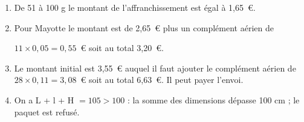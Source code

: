 \begin{enumerate}
\item %
De 51 à 100 g le montant de l'affranchissement est égal à 1,65~\euro. 
\item %
Pour Mayotte le montant est de 2,65~\euro{} plus un complément aérien de 

$11 \times 0,05 = 0,55$~\euro{} soit au total 3,20~\euro. 

 
\item %


Le montant initial est 3,55~\euro{} auquel il faut ajouter le complément aérien de $28 \times 0,11 = 3,08$~\euro{} soit au total  6,63~\euro. Il peut payer l'envoi.
\item %
On a L + l + H $= 105 > 100$ : la somme des dimensions dépasse 100 cm ; le paquet est refusé.
\end{enumerate}

\vspace{0,5cm}

